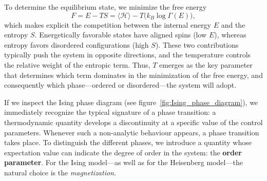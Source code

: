 To determine the equilibrium state, we minimize the free energy
\[
    F = E - TS = \langle \mathcal{H} \rangle
    - T \bigl(k_B \log \Gamma(E)\bigr),
\]
which makes explicit the competition between the internal energy \(E\) and the entropy \(S\). Energetically favorable states have aligned spins (low \(E\)), whereas entropy favors disordered configurations (high \(S\)). These two contributions typically push the system in opposite directions, and the temperature controls the relative weight of the entropic term.
Thus, \(T\) emerges as the key parameter that determines which term dominates in the minimization of the free energy, and consequently which phase---ordered or disordered—the system will adopt.
\begin{figure}[H]
    \centering
\end{figure}
If we inspect the Ising phase diagram (see figure~\ref{fig:Ising_phase_diagram}), we immediately recognize the typical signature of a phase transition: a thermodynamic quantity develops a discontinuity at a specific value of the control parameters. Whenever such a non-analytic behaviour appears, a phase transition takes place. To distinguish the different phases, we introduce a quantity whose expectation value can indicate the degree of order in the system: the \textbf{order parameter}. For the Ising model---as well as for the Heisenberg model—the natural choice is the \textit{magnetization}.
